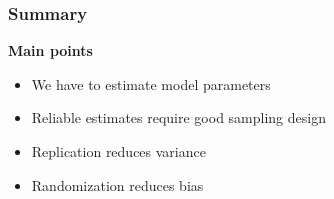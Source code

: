 \documentclass[color=usenames,dvipsnames]{beamer}\usepackage[]{graphicx}\usepackage[]{color}
\begin{document}



\begin{frame}
  \frametitle{Summary}
  \Large
  {\bf Main points}
  \begin{itemize}
    \item We have to estimate model parameters
    \item Reliable estimates require good sampling design
    \item Replication reduces variance
    \item Randomization reduces bias
  \end{itemize}
\end{frame}




















\end{document}

